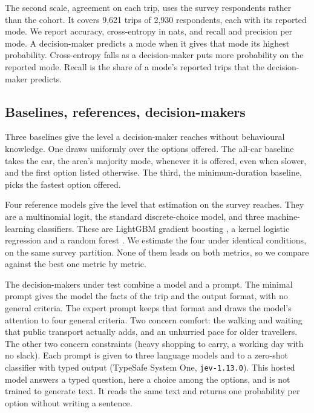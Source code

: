 The second scale, agreement on each trip, uses the survey respondents rather than the
cohort. It covers 9{,}621 trips of 2{,}930 respondents, each with its reported mode. We report
accuracy, cross-entropy in nats, and recall and precision per mode. A decision-maker predicts
a mode when it gives that mode its highest probability. Cross-entropy falls as a
decision-maker puts more probability on the reported mode. Recall is the share of a mode's
reported trips that the decision-maker predicts.

\subsection{Baselines, references, decision-makers}
\label{sec:deciders}

Three baselines give the level a decision-maker reaches without behavioural knowledge. One
draws uniformly over the options offered. The all-car baseline takes the car, the area's
majority mode, whenever it is offered, even when slower, and the first option listed
otherwise. The third, the minimum-duration baseline, picks the fastest option offered.

Four reference models give the level that estimation on the survey reaches. They are a
multinomial logit, the standard discrete-choice model, and three machine-learning
classifiers. These are LightGBM gradient boosting \citep{ke2017lightgbm}, a kernel logistic
regression \citep{zhu2005kernel} and a random forest \citep{breiman2001random}. We estimate
the four under identical conditions, on the same survey partition. None of them leads on both
metrics, so we compare against the best one metric by metric.

The decision-makers under test combine a model and a prompt. The minimal prompt gives the
model the facts of the trip and the output format, with no general criteria. The expert
prompt keeps that format and draws the model's attention to four general criteria. Two
concern comfort: the walking and waiting that public transport actually adds, and an
unhurried pace for older travellers. The other two concern constraints (heavy shopping to
carry, a working day with no slack). Each prompt is given to three language models and to a
zero-shot classifier with typed output (TypeSafe System One, \texttt{jev-1.13.0}). This
hosted model answers a typed question, here a choice among the options, and is not trained
to generate text. It reads the same text and returns one probability per option without
writing a sentence.

